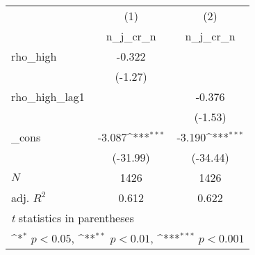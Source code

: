 {
\def\sym#1{\ifmmode^{#1}\else\(^{#1}\)\fi}
\begin{tabular}{l*{2}{c}}
\toprule
            &\multicolumn{1}{c}{(1)}&\multicolumn{1}{c}{(2)}\\
            &\multicolumn{1}{c}{n\_j\_cr\_n}&\multicolumn{1}{c}{n\_j\_cr\_n}\\
\midrule
rho\_high    &      -0.322         &                     \\
            &     (-1.27)         &                     \\
\addlinespace
rho\_high\_lag1&                     &      -0.376         \\
            &                     &     (-1.53)         \\
\addlinespace
\_cons      &      -3.087\sym{***}&      -3.190\sym{***}\\
            &    (-31.99)         &    (-34.44)         \\
\midrule
\(N\)       &        1426         &        1426         \\
adj. \(R^{2}\)&       0.612         &       0.622         \\
\bottomrule
\multicolumn{3}{l}{\footnotesize \textit{t} statistics in parentheses}\\
\multicolumn{3}{l}{\footnotesize \sym{*} \(p<0.05\), \sym{**} \(p<0.01\), \sym{***} \(p<0.001\)}\\
\end{tabular}
}
